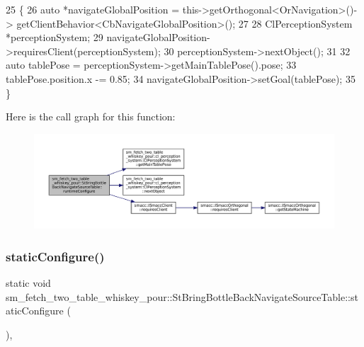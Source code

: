 \begin{DoxyCode}
25         \{
26             \textcolor{keyword}{auto} *navigateGlobalPosition = this->getOrthogonal<OrNavigation>()->
      getClientBehavior<CbNavigateGlobalPosition>();
27 
28             ClPerceptionSystem *perceptionSystem;
29             navigateGlobalPosition->requiresClient(perceptionSystem);
30             perceptionSystem->nextObject();
31 
32             \textcolor{keyword}{auto} tablePose = perceptionSystem->getMainTablePose().pose;
33             tablePose.position.x -= 0.85;
34             navigateGlobalPosition->setGoal(tablePose);
35         \}
\end{DoxyCode}
Here is the call graph for this function\+:
\nopagebreak
\begin{figure}[H]
\begin{center}
\leavevmode
\includegraphics[width=350pt]{structsm__fetch__two__table__whiskey__pour_1_1StBringBottleBackNavigateSourceTable_a7f19e9282a3d89c41a41e0a8e66177dc_cgraph}
\end{center}
\end{figure}
\mbox{\label{structsm__fetch__two__table__whiskey__pour_1_1StBringBottleBackNavigateSourceTable_aca9f43b53b95cbfe59544165064596cc}} 
\subsubsection{\texorpdfstring{static\+Configure()}{staticConfigure()}}
{\footnotesize\ttfamily static void sm\+\_\+fetch\+\_\+two\+\_\+table\+\_\+whiskey\+\_\+pour\+::\+St\+Bring\+Bottle\+Back\+Navigate\+Source\+Table\+::static\+Configure (\begin{DoxyParamCaption}{ }\end{DoxyParamCaption})\hspace{0.3cm}{\ttfamily [inline]}, {\ttfamily [static]}}



